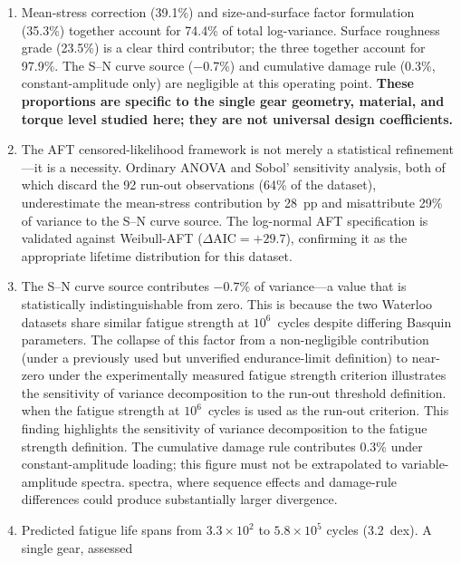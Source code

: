 \documentclass[12pt,a4paper]{article}
\begin{document}
\begin{enumerate}
  \item Mean-stress correction (39.1\%) and size-and-surface factor
        formulation (35.3\%) together account for 74.4\% of total
        log-variance. Surface roughness grade (23.5\%) is a clear third
        contributor; the three together account for 97.9\%. The S--N curve
        source ($-$0.7\%) and cumulative damage rule (0.3\%, constant-amplitude only) are negligible
        at this operating point. \textbf{These proportions are specific to
        the single gear geometry, material, and torque level studied here;
        they are not universal design coefficients.}
  \item The AFT censored-likelihood framework is not merely a statistical
        refinement---it is a necessity. Ordinary ANOVA and Sobol' sensitivity
        analysis, both of which discard the 92 run-out observations
        (64\% of the dataset), underestimate the mean-stress contribution
        by 28~pp and misattribute 29\% of variance to the S--N curve
        source. The log-normal AFT specification is validated against
        Weibull-AFT ($\Delta\mathrm{AIC} = +29.7$), confirming it as the
        appropriate lifetime distribution for this dataset.
  \item The S--N curve source contributes $-0.7$\% of variance---a
        value that is statistically indistinguishable from zero. This
        is because the two Waterloo datasets share similar fatigue
        strength at $10^6$~cycles despite differing Basquin parameters.
        The collapse of this factor from a non-negligible contribution
        (under a previously used but unverified endurance-limit
        definition) to near-zero under the experimentally measured
        fatigue strength criterion illustrates the sensitivity of
        variance decomposition to the run-out threshold definition.
        when the fatigue strength at $10^6$~cycles is used as the
        run-out criterion. This finding highlights the sensitivity of
        variance decomposition to the fatigue strength definition.
        The cumulative damage rule contributes 0.3\% under
        constant-amplitude loading; this figure must not be extrapolated
        to variable-amplitude spectra.
        spectra, where sequence effects and damage-rule differences could
        produce substantially larger divergence.
  \item Predicted fatigue life spans from $3.3\times10^2$ to
        $5.8\times10^5$ cycles (3.2~dex). A single gear, assessed

\end{enumerate}
\end{document}
